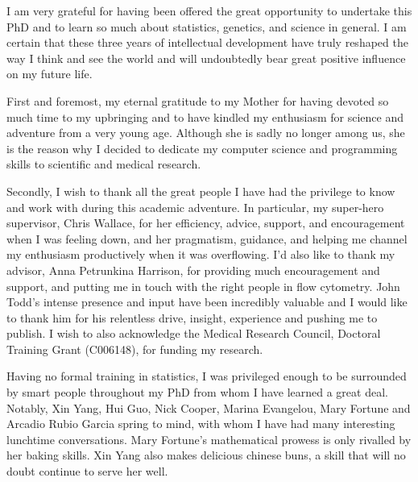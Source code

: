 
\begin{acknowledgements}      


 I am very grateful for having been offered the great opportunity to undertake this PhD and to learn so much about statistics, genetics, and science in general.
 I am certain that these three years of intellectual development have truly reshaped the way I think and see the world and will undoubtedly bear great positive influence on my future life.

 First and foremost, my eternal gratitude to my Mother for having devoted so much time to my upbringing and to have kindled my enthusiasm for science and adventure from a very young age.
 Although she is sadly no longer among us, she is the reason why I decided to dedicate my computer science and programming skills to scientific and medical research.

 Secondly, I wish to thank all the great people I have had the privilege to know and work with during this academic adventure.
 In particular, my super-hero supervisor, Chris Wallace, for her efficiency, advice, support, and encouragement when I was feeling down, and her pragmatism, guidance, and helping me channel my enthusiasm productively when it was overflowing.
 I'd also like to thank my advisor, Anna Petrunkina Harrison, for providing much encouragement and support, and putting me in touch with the right people in flow cytometry.
 John Todd's intense presence and input have been incredibly valuable and I would like to thank him for his relentless drive, insight, experience and pushing me to publish.
 I wish to also acknowledge the Medical Research Council, Doctoral Training Grant (C006148), for funding my research.

 Having no formal training in statistics, I was privileged enough to be surrounded by smart people throughout my PhD from whom I have learned a great deal.
 Notably, Xin Yang, Hui Guo, Nick Cooper, Marina Evangelou, Mary Fortune and Arcadio Rubio Garcia spring to mind, with whom I have had many interesting lunchtime conversations.
 Mary Fortune's  mathematical prowess is only rivalled by her baking skills.
 Xin Yang also makes delicious chinese buns, a skill that will no doubt continue to serve her well.


\end{acknowledgements}
